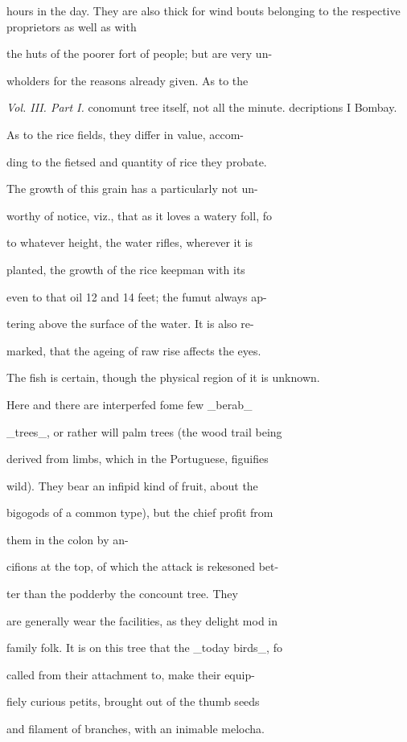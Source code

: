 \documentclass{article}
\begin{document}
hours in the day. They are also thick for wind bouts belonging to the respective proprietors as well as with

the huts of the poorer fort of people; but are very un-

wholders for the reasons already given. As to the

\textit{Vol. III. Part I.}
conomunt tree itself, not all the minute. decriptions I Bombay.

As to the rice fields, they differ in value, accom-

ding to the fietsed and quantity of rice they probate.

The growth of this grain has a particularly not un-

worthy of notice, viz., that as it loves a watery foll, fo

to whatever height, the water rifles, wherever it is

planted, the growth of the rice keepman with its

even to that oil 12 and 14 feet; the fumut always ap-

tering above the surface of the water. It is also re-

marked, that the ageing of raw rise affects the eyes.

The fish is certain, though the physical region of it is unknown.

Here and there are interperfed fome few \_berab\_

\_trees\_, or rather will palm trees (the wood trail being

derived from limbs, which in the Portuguese, figuifies

wild). They bear an infipid kind of fruit, about the

bigogods of a common type), but the chief profit from

them in the colon by an-

cifions at the top, of which the attack is rekesoned bet-

ter than the podderby the concount tree. They

are generally wear the facilities, as they delight mod in

family folk. It is on this tree that the \_today birds\_, fo

called from their attachment to, make their equip-

fiely curious petits, brought out of the thumb seeds

and filament of branches, with an inimable melocha.
\end{document}
